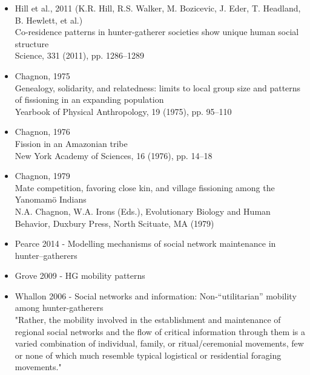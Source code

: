 \documentclass[11pt,oneside,a4paper,onecolumn]{article}
\begin{document}
\begin{itemize}

	\item Hill et al., 2011 (K.R. Hill, R.S. Walker, M. Bozicevic, J. Eder, T. Headland, B. Hewlett, et al.)\\
Co-residence patterns in hunter-gatherer societies show unique human social structure\\
Science, 331 (2011), pp. 1286–1289 

	\item Chagnon, 1975\\
    Genealogy, solidarity, and relatedness: limits to local group size and patterns of fissioning in an expanding population\\
    Yearbook of Physical Anthropology, 19 (1975), pp. 95–110

	\item Chagnon, 1976\\
    Fission in an Amazonian tribe\\
    New York Academy of Sciences, 16 (1976), pp. 14–18
    
   \item  Chagnon, 1979\\
    Mate competition, favoring close kin, and village fissioning among the Yanomamö Indians\\
    N.A. Chagnon, W.A. Irons (Eds.), Evolutionary Biology and Human Behavior, Duxbury Press, North Scituate, MA (1979)
    
    \item Pearce 2014 - Modelling mechanisms of social network maintenance in hunter–gatherers
    
    \item Grove 2009 - HG mobility patterns
    
    \item Whallon 2006 - Social networks and information: Non-“utilitarian” mobility among hunter-gatherers\\
    "Rather, the mobility involved in the establishment and maintenance of regional social networks and the flow of critical information through them is a varied combination of individual, family, or ritual/ceremonial movements, few or none of which much resemble typical logistical or residential foraging movements."

\end{itemize}
\end{document}
